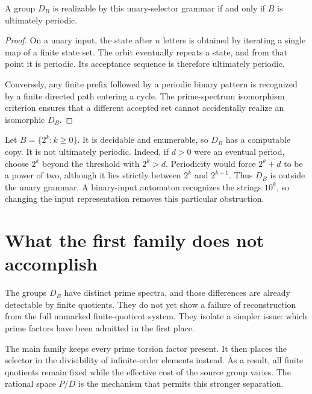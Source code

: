 \begin{theorem}
\label{thm:unary}
A group $D_B$ is realizable by this unary-selector grammar if and only if $B$ is ultimately periodic.
\end{theorem}
\begin{proof}
On a unary input, the state after $n$ letters is obtained by iterating a single map of a finite state set. The orbit eventually repeats a state, and from that point it is periodic. Its acceptance sequence is therefore ultimately periodic.

Conversely, any finite prefix followed by a periodic binary pattern is recognized by a finite directed path entering a cycle. The prime-spectrum isomorphism criterion ensures that a different accepted set cannot accidentally realize an isomorphic $D_B$.
\end{proof}

\begin{example}
Let $B=\{2^k:k\ge0\}$. It is decidable and enumerable, so $D_B$ has a computable copy. It is not ultimately periodic. Indeed, if $d>0$ were an eventual period, choose $2^k$ beyond the threshold with $2^k>d$. Periodicity would force $2^k+d$ to be a power of two, although it lies strictly between $2^k$ and $2^{k+1}$. Thus $D_B$ is outside the unary grammar. A binary-input automaton recognizes the strings $10^k$, so changing the input representation removes this particular obstruction.
\end{example}

\section{What the first family does not accomplish}
The groups $D_B$ have distinct prime spectra, and those differences are already detectable by finite quotients. They do not yet show a failure of reconstruction from the full unmarked finite-quotient system. They isolate a simpler issue: which prime factors have been admitted in the first place.

The main family keeps every prime torsion factor present. It then places the selector in the divisibility of infinite-order elements instead. As a result, all finite quotients remain fixed while the effective cost of the source group varies. The rational space $P/D$ is the mechanism that permits this stronger separation.
